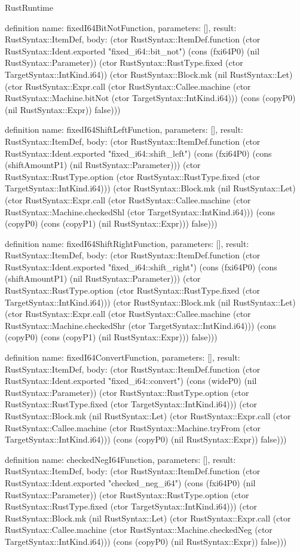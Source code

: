 \begin{lexlean}{RustRuntime}
\begin{semanticmodule}
definition{
  name: fixedI64BitNotFunction,
  parameters: [],
  result: RustSyntax::ItemDef,
  body: (ctor RustSyntax::ItemDef.function (ctor RustSyntax::Ident.exported "fixed_i64::bit_not") (cons (fxi64P0) (nil RustSyntax::Parameter)) (ctor RustSyntax::RustType.fixed (ctor TargetSyntax::IntKind.i64)) (ctor RustSyntax::Block.mk (nil RustSyntax::Let) (ctor RustSyntax::Expr.call (ctor RustSyntax::Callee.machine (ctor RustSyntax::Machine.bitNot (ctor TargetSyntax::IntKind.i64))) (cons (copyP0) (nil RustSyntax::Expr)) false)))
}

definition{
  name: fixedI64ShiftLeftFunction,
  parameters: [],
  result: RustSyntax::ItemDef,
  body: (ctor RustSyntax::ItemDef.function (ctor RustSyntax::Ident.exported "fixed_i64::shift_left") (cons (fxi64P0) (cons (shiftAmountP1) (nil RustSyntax::Parameter))) (ctor RustSyntax::RustType.option (ctor RustSyntax::RustType.fixed (ctor TargetSyntax::IntKind.i64))) (ctor RustSyntax::Block.mk (nil RustSyntax::Let) (ctor RustSyntax::Expr.call (ctor RustSyntax::Callee.machine (ctor RustSyntax::Machine.checkedShl (ctor TargetSyntax::IntKind.i64))) (cons (copyP0) (cons (copyP1) (nil RustSyntax::Expr))) false)))
}

definition{
  name: fixedI64ShiftRightFunction,
  parameters: [],
  result: RustSyntax::ItemDef,
  body: (ctor RustSyntax::ItemDef.function (ctor RustSyntax::Ident.exported "fixed_i64::shift_right") (cons (fxi64P0) (cons (shiftAmountP1) (nil RustSyntax::Parameter))) (ctor RustSyntax::RustType.option (ctor RustSyntax::RustType.fixed (ctor TargetSyntax::IntKind.i64))) (ctor RustSyntax::Block.mk (nil RustSyntax::Let) (ctor RustSyntax::Expr.call (ctor RustSyntax::Callee.machine (ctor RustSyntax::Machine.checkedShr (ctor TargetSyntax::IntKind.i64))) (cons (copyP0) (cons (copyP1) (nil RustSyntax::Expr))) false)))
}

definition{
  name: fixedI64ConvertFunction,
  parameters: [],
  result: RustSyntax::ItemDef,
  body: (ctor RustSyntax::ItemDef.function (ctor RustSyntax::Ident.exported "fixed_i64::convert") (cons (wideP0) (nil RustSyntax::Parameter)) (ctor RustSyntax::RustType.option (ctor RustSyntax::RustType.fixed (ctor TargetSyntax::IntKind.i64))) (ctor RustSyntax::Block.mk (nil RustSyntax::Let) (ctor RustSyntax::Expr.call (ctor RustSyntax::Callee.machine (ctor RustSyntax::Machine.tryFrom (ctor TargetSyntax::IntKind.i64))) (cons (copyP0) (nil RustSyntax::Expr)) false)))
}

definition{
  name: checkedNegI64Function,
  parameters: [],
  result: RustSyntax::ItemDef,
  body: (ctor RustSyntax::ItemDef.function (ctor RustSyntax::Ident.exported "checked_neg_i64") (cons (fxi64P0) (nil RustSyntax::Parameter)) (ctor RustSyntax::RustType.option (ctor RustSyntax::RustType.fixed (ctor TargetSyntax::IntKind.i64))) (ctor RustSyntax::Block.mk (nil RustSyntax::Let) (ctor RustSyntax::Expr.call (ctor RustSyntax::Callee.machine (ctor RustSyntax::Machine.checkedNeg (ctor TargetSyntax::IntKind.i64))) (cons (copyP0) (nil RustSyntax::Expr)) false)))
}


\end{semanticmodule}
\end{lexlean}
